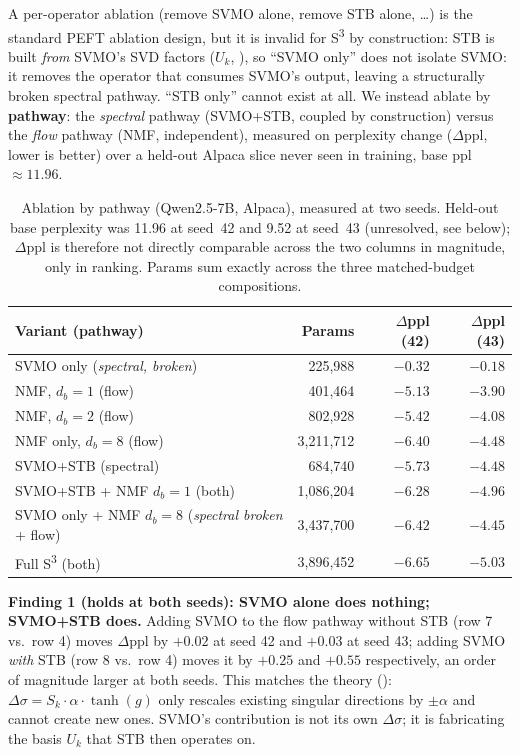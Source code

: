 \documentclass{scpe}
\newcommand{\sthree}{S\textsuperscript{3}}
\begin{document}
A per-operator ablation (remove SVMO alone, remove STB alone, \ldots) is the standard PEFT ablation design, but it is invalid for \sthree{} by construction: STB is built \emph{from} SVMO's SVD factors ($U_k$, ), so ``SVMO only'' does not isolate SVMO: it removes the operator that consumes SVMO's output, leaving a structurally broken spectral pathway. ``STB only'' cannot exist at all. We instead ablate by \textbf{pathway}: the \textit{spectral} pathway (SVMO+STB, coupled by construction) versus the \textit{flow} pathway (NMF, independent), measured on perplexity change ($\Delta$ppl, lower is better) over a held-out Alpaca slice never seen in training, base ppl $\approx 11.96$.

\begin{table}[t]
\centering
\caption{Ablation by pathway (Qwen2.5-7B, Alpaca), measured at two seeds. Held-out base perplexity was 11.96 at seed~42 and 9.52 at seed~43 (unresolved, see below); $\Delta$ppl is therefore not directly comparable across the two columns in magnitude, only in ranking. Params sum exactly across the three matched-budget compositions.}
\label{tab:pathways}
\centering
\begin{tabular}{@{}lrrr@{}}
\toprule
\textbf{Variant (pathway)} & \textbf{Params} & \textbf{$\Delta$ppl (42)} & \textbf{$\Delta$ppl (43)} \\
\midrule
SVMO only (\textit{spectral, broken}) & 225,988 & $-0.32$ & $-0.18$ \\
NMF, $d_b{=}1$ (flow) & 401,464 & $-5.13$ & $-3.90$ \\
NMF, $d_b{=}2$ (flow) & 802,928 & $-5.42$ & $-4.08$ \\
NMF only, $d_b{=}8$ (flow) & 3,211,712 & $-6.40$ & $-4.48$ \\
SVMO+STB (spectral) & 684,740 & $-5.73$ & $-4.48$ \\
SVMO+STB + NMF $d_b{=}1$ (both) & 1,086,204 & $-6.28$ & $-4.96$ \\
SVMO only + NMF $d_b{=}8$ (\textit{spectral broken} + flow) & 3,437,700 & $-6.42$ & $-4.45$ \\
Full \sthree{} (both) & 3,896,452 & $-6.65$ & $-5.03$ \\
\bottomrule
\end{tabular}
\end{table}

\textbf{Finding 1 (holds at both seeds): SVMO alone does nothing; SVMO+STB does.} Adding SVMO to the flow pathway without STB (row 7 vs.\ row 4) moves $\Delta$ppl by $+0.02$ at seed 42 and $+0.03$ at seed 43; adding SVMO \emph{with} STB (row 8 vs.\ row 4) moves it by $+0.25$ and $+0.55$ respectively, an order of magnitude larger at both seeds. This matches the theory (): $\Delta\sigma = S_k \cdot \alpha \cdot \tanh(g)$ only rescales existing singular directions by $\pm\alpha$ and cannot create new ones. SVMO's contribution is not its own $\Delta\sigma$; it is fabricating the basis $U_k$ that STB then operates on.
\end{document}
